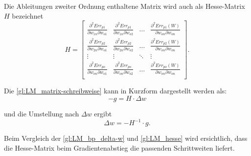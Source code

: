 Die Ableitungen zweiter Ordnung enthaltene Matrix wird auch als Hesse-Matrix $H$ bezeichnet
\begin{equation}
H
 =
 \begin{bmatrix}
    \frac{\partial^2 Err_{p1}}{\partial w_{1n} \partial w_{o1}} & \frac{\partial^2 Err_{p1}}{\partial w_{1n} \partial w_{o2}}  & \dots  & \frac{\partial^2 Err_{p1}(W)}{\partial w_{on} \partial w_{on}} \\
    \frac{\partial^2 Err_{p2}}{\partial w_{2n} \partial w_{o1}} & \frac{\partial^2 Err_{p2}}{\partial w_{2n} \partial w_{o2}}  & \dots  & \frac{\partial^2 Err_{p2}(W)}{\partial w_{on} \partial w_{on}} \\
    \vdots & \vdots & \ddots & \vdots \\
    \frac{\partial^2 Err_{po}}{\partial w_{on} \partial w_{o1}} & \frac{\partial^2 Err_{po}}{\partial w_{on} \partial w_{o2}}  & \dots  & \frac{\partial^2 Err_{po}(W)}{\partial w_{on} \partial w_{on}} \\
 \label{gl:LM_hesse-mat}
 \end{bmatrix}
 .
\end{equation}

Die \autoref{gl:LM_matrix-schreibweise} kann in Kurzform dargestellt werden als:
\begin{equation}
-g=H \cdot \Delta w
\end{equation}

und die Umstellung nach $\Delta w$ ergibt
\begin{equation}
\Delta w =-H^{-1} \cdot g.
\label{gl:LM_hesse}
\end{equation}

Beim Vergleich der \autoref{gl:LM_bp_delta-w} und \autoref{gl:LM_hesse} wird ersichtlich, dass die Hesse-Matrix beim Gradientenabstieg die passenden Schrittweiten liefert.

